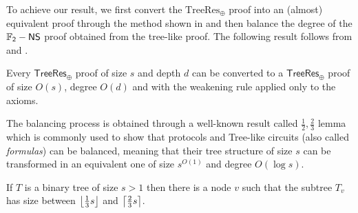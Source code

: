 To achieve our result, we first convert the $\mathrm{TreeRes}_\oplus$ proof into an (almost) equivalent proof through the method shown in  and then balance the degree of the $\mathsf{\mathbb{F}_2-NS}$ proof obtained from the tree-like proof. The following result follows from  and .

\begin{corollary}
    \label{leaf_weakening}
 Every $\mathsf{TreeRes}_{\oplus}$ proof of size $s$ and depth $d$ can be converted to a $\mathsf{TreeRes}_{\oplus}$ proof of size $O(s)$, degree $O(d)$ and with the weakening rule applied only to the axioms.
\end{corollary}

The balancing process is obtained through a well-known result called $\frac{1}{2}, \frac{2}{3}$ lemma \cite{13_23_lemma} which is commonly used to show that protocols and Tree-like circuits (also called \textit{formulas}) can be balanced, meaning that their tree structure of size $s$ can be transformed in an equivalent one of size $s^{O(1)}$ and degree $O(\log s)$.

\begin{lemma}
    \label{13_23_lewis}
 If $T$ is a binary tree of size $s > 1$ then there is a node $v$ such that the subtree $T_v$ has size between $\left \lfloor \frac{1}{3} s \right \rfloor$ and $\left \lceil \frac{2}{3} s \right \rceil$.
\end{lemma}

